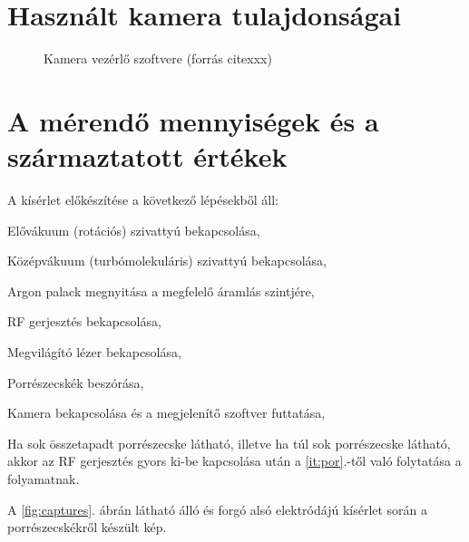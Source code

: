 \section{Használt kamera tulajdonságai}


\begin{figure}[htp]
\begin{center}
  \caption[Kamera vezérlő szoftvere]{Kamera vezérlő szoftvere (forrás cite{xxx})}
  \label{fig:cam_sw}
\end{center}
\end{figure}







	
\section{A mérendő mennyiségek és a származtatott értékek}
	A kísérlet előkészítése a következő lépésekből áll:
	\begin{enumerate*}
		\item Elővákuum {\color{red}(rotációs)} szivattyú bekapcsolása,
		\item Középvákuum {\color{red}(turbómolekuláris)} szivattyú bekapcsolása,
		\item Argon palack megnyitása a megfelelő áramlás szintjére,
		\item RF gerjesztés bekapcsolása,
		\item Megvilágító lézer bekapcsolása,
		\item \label{it:por} Porrészecskék beszórása,
		\item Kamera bekapcsolása és a megjelenítő szoftver futtatása,
		\item Ha sok összetapadt porrészecske látható, illetve ha túl sok porrészecske látható, akkor
		az RF gerjesztés gyors ki-be kapcsolása után a \ref{it:por}.-től való folytatása a folyamatnak.
	\end{enumerate*}
	A \ref{fig:captures}. ábrán látható álló és forgó alsó elektródájú kísérlet során a
	porrészecskékről készült kép.
	

